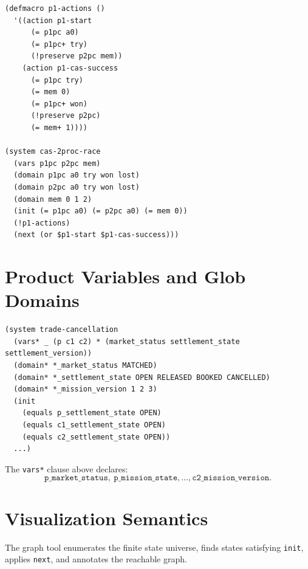 \documentclass[11pt]{article}
\begin{document}
\begin{lstlisting}[language=DSTR]
(defmacro p1-actions ()
  '((action p1-start
      (= p1pc a0)
      (= p1pc+ try)
      (!preserve p2pc mem))
    (action p1-cas-success
      (= p1pc try)
      (= mem 0)
      (= p1pc+ won)
      (!preserve p2pc)
      (= mem+ 1))))

(system cas-2proc-race
  (vars p1pc p2pc mem)
  (domain p1pc a0 try won lost)
  (domain p2pc a0 try won lost)
  (domain mem 0 1 2)
  (init (= p1pc a0) (= p2pc a0) (= mem 0))
  (!p1-actions)
  (next (or $p1-start $p1-cas-success)))
\end{lstlisting}

\section{Product Variables and Glob Domains}

\begin{lstlisting}[language=DSTR]
(system trade-cancellation
  (vars* _ (p c1 c2) * (market_status settlement_state settlement_version))
  (domain* *_market_status MATCHED)
  (domain* *_settlement_state OPEN RELEASED BOOKED CANCELLED)
  (domain* *_mission_version 1 2 3)
  (init
    (equals p_settlement_state OPEN)
    (equals c1_settlement_state OPEN)
    (equals c2_settlement_state OPEN))
  ...)
\end{lstlisting}

The \texttt{vars*} clause above declares:
\[
\texttt{p\_market\_status},\ \texttt{p\_mission\_state},\ldots,
\texttt{c2\_mission\_version}.
\]

\section{Visualization Semantics}

The graph tool enumerates the finite state universe, finds states satisfying
\texttt{init}, applies \texttt{next}, and annotates the reachable graph.

\begin{center}
\end{center}
\end{document}
